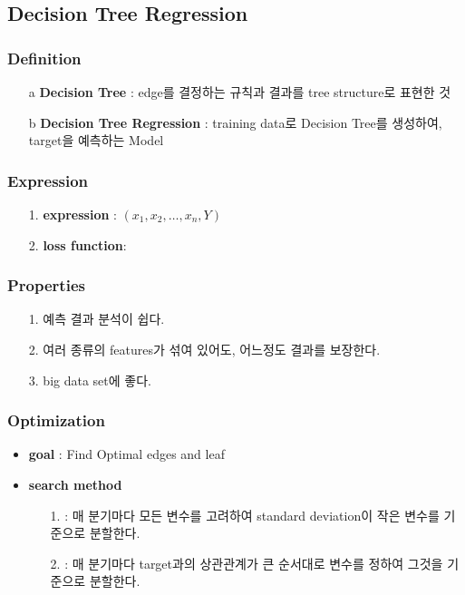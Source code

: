 \documentclass{article}
\begin{document}
\subsection{Decision Tree Regression}
\subsubsection{Definition}
\begin{itemize}
    \item[a] \textbf{Decision Tree} : edge를 결정하는 규칙과 결과를 tree structure로 표현한 것
    \item[b] \textbf{Decision Tree Regression} : training data로 Decision Tree를 생성하여, target을 예측하는 Model
\end{itemize}

\subsubsection{Expression}
\begin{itemize}
    \item[1.] \textbf{expression} : $(x_1, x_2, \dots, x_n, Y)$
    \item[2.] \textbf{loss function}: 
\end{itemize}

\subsubsection{Properties}
\begin{itemize}
    \item [1.] 예측 결과 분석이 쉽다.
    \item [2.] 여러 종류의 features가 섞여 있어도, 어느정도 결과를 보장한다.
    \item [3.] big data set에 좋다.
\end{itemize}

\subsubsection{Optimization}
\begin{itemize}
    \item \textbf{goal} : Find Optimal edges and leaf
    \item \textbf{search method}
        \begin{itemize}
            \item[1.] : 매 분기마다 모든 변수를 고려하여 standard deviation이 작은 변수를 기준으로 분할한다.
            \item[2.] : 매 분기마다 target과의 상관관계가 큰 순서대로 변수를 정하여 그것을 기준으로 분할한다.
        \end{itemize}
\end{itemize}
\end{document}

